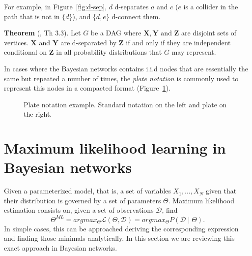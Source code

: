 \documentclass[11pt]{article}
\theoremstyle{definition}
\begin{document}
For example, in Figure~\ref{fig:d-sep}, \(d\) d-separates \(a\) and \(c\) (\(e\)
is a collider in the path that is not in \(\{d\}\)),
and \(\{d,e\}\) d-connect them.

\textbf{Theorem} (\cite{spirtes2000causation}, Th 3.3). Let \(G\) be a DAG where \(\bm{X}, \bm{Y} \text{ and } \bm{Z}\)
are disjoint sets of vertices. \(\bm{X}\) and \(\bm{Y}\)
are d-separated by \(\bm{Z}\) if and only if they are independent conditional
on \(\bm{Z}\) in all probability distributions that \(G\) may represent.


In cases where the Bayesian networks contains i.i.d nodes that are
essentially the same but repeated a number of times, the \emph{plate notation} is commonly used to represent this nodes in a compacted format (Figure~\ref{fig:plate_notation}).

\begin{figure}[t]
\centering
{}
\caption{Plate notation example. Standard notation on the left and plate on the right.}\label{fig:plate_notation}
\end{figure}


\section{Maximum likelihood learning in Bayesian networks}

Given a parameterized model, that is, a set of variables \( X_1,\dots,X_N \) given that their distribution is governed by a set of parameters \( \Theta \). Maximum likelihood estimation consists on, given a set of observations \( \mathcal{D} \), find
\[
   \Theta^{ML} = argmax_{\Theta} \mathcal{L}(\Theta, \mathcal{D}) =  argmax_{\Theta} P(\mathcal{D} \mid \Theta).
\] 
In simple cases, this can be approached deriving the corresponding expression and finding those minimals analytically. In this section we are reviewing this exact approach in Bayesian networks.
\end{document}
